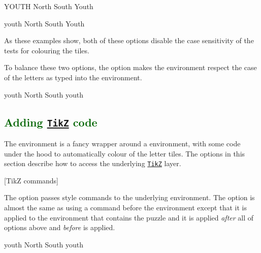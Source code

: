 \documentclass[svgnames]{report}
\newcommand\ctan[1]{\href{https://www.ctan.org/pkg/#1}{\texttt{#1}}}
\newcommand\Section[1]{\subsection{\textcolor{DarkGreen}{#1}}}
\begin{document}
  \begin{example}
    \begin{wordle}{YOUTH}
      North
      South
      Youth
    \end{wordle}
  \end{example}

  \begin{example}
    \begin{wordle}{youth}
      North
      South
      Youth
    \end{wordle}
  \end{example}

  As these examples show, both of these options disable the case sensitivity of the tests for colouring the  tiles.

  To balance these two options, the  option makes
  the  environment respect the case of the letters as
  typed into the environment.

  \begin{example}
    \begin{wordle}{youth} %
      North
      South
      youth
    \end{wordle}
  \end{example}

  \Section{Adding \ctan{TikZ} code}

  The  environment is a fancy wrapper around a
   environment, with some code under the hood
  to automatically colour of the letter tiles. The options in this
  section describe how to access the underlying \ctan{TikZ} layer.

  [TikZ commands]

  The  option passes style commands to the underlying
   environment. The  option is almost
  the same as using a \keyword{\tikzset{...}} command before the
   environment except that it is applied to the
   environment that contains the 
  puzzle and it is applied \textit{after} all of options above and
  \textit{before}  is applied.

  \begin{example}
    \begin{wordle}[
        tikz={framed,
              background rectangle/.style={
                double,ultra thick,
                draw=SteelBlue,
              }
        }]{youth}
      North
      South
      youth
    \end{wordle}
  \end{example}
\end{document}
